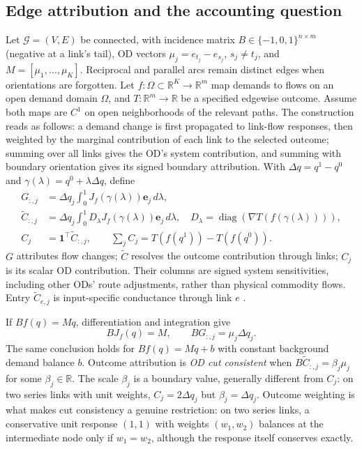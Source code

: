 \documentclass[a4paper,fleqn]{cas-sc}
\newcommand{\R}{\mathbb{R}}
\begin{document}
\subsection{Edge attribution and the accounting question}
Let $\mathcal G=(V,E)$ be connected, with incidence matrix
$B\in\{-1,0,1\}^{n\times m}$ (negative at a link's tail), OD vectors
$\mu_j=e_{t_j}-e_{s_j}$, $s_j\ne t_j$, and $M=[\mu_1,\ldots,\mu_K]$.
Reciprocal and parallel arcs remain distinct edges when orientations are
forgotten. Let $f:\Omega\subset\R^K\to\R^m$ map demands to flows on an
open demand domain $\Omega$, and
$T:\R^m\to\R$ be a specified edgewise outcome. Assume both maps are $C^1$
on open neighborhoods of the relevant paths. The construction reads as
follows: a demand change is first propagated to link-flow responses,
then weighted by the marginal contribution of each link to the selected
outcome; summing over all links gives the OD's system contribution, and
summing with boundary orientation gives its signed boundary attribution.
With $\Delta q=q^1-q^0$ and
$\gamma(\lambda)=q^0+\lambda\Delta q$, define
\begin{align}
G_{:,j}&=\Delta q_j\int_0^1 J_f(\gamma(\lambda))\mathbf e_j\,d\lambda,
\label{eq:Gdef}\\
\widetilde C_{:,j}&=\Delta q_j\int_0^1 D_\lambda J_f(\gamma(\lambda))\mathbf e_j\,d\lambda,
\quad D_\lambda=\operatorname{diag}(\nabla T(f(\gamma(\lambda)))),
\label{eq:Cdef}\\
C_j&=\mathbf1^\top\widetilde C_{:,j},\qquad
\sum_j C_j=T(f(q^1))-T(f(q^0)).\label{eq:Cscalar}
\end{align}
$G$ attributes flow changes; $\widetilde C$ resolves the outcome contribution
through links; $C_j$ is its scalar OD contribution. Their columns are signed
system sensitivities, including other ODs' route adjustments, rather than
physical commodity flows. Entry $\widetilde C_{e,j}$ is input-specific
conductance through link $e$ \citep{dhamdhere2019important}.\label{sec:whyC}

If $Bf(q)=Mq$, differentiation and integration give
\begin{equation}
BJ_f(q)=M,\qquad BG_{:,j}=\mu_j\Delta q_j.\label{eq:anchorchain}
\end{equation}
The same conclusion holds for $Bf(q)=Mq+b$ with constant background demand
balance $b$. Outcome attribution is \emph{OD cut consistent} when
$B\widetilde C_{:,j}=\beta_j\mu_j$ for some $\beta_j\in\R$.
The scale $\beta_j$ is a boundary value, generally different from $C_j$:
on two series links with unit weights, $C_j=2\Delta q_j$ but
$\beta_j=\Delta q_j$. Outcome weighting is what makes cut consistency a
genuine restriction: on two series links, a conservative unit response
$(1,1)$ with weights $(w_1,w_2)$ balances at the intermediate node only
if $w_1=w_2$, although the response itself conserves exactly.
\end{document}
